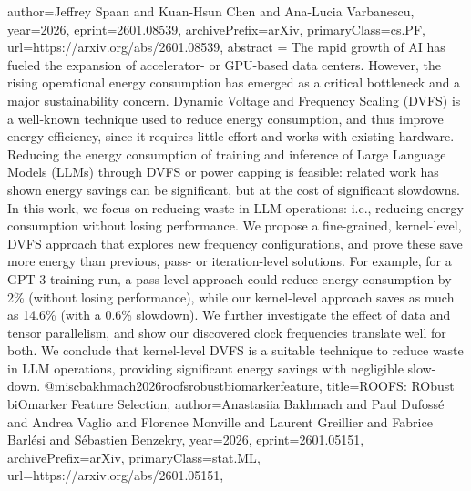 {      author={Jeffrey Spaan and Kuan-Hsun Chen and Ana-Lucia Varbanescu},
      year={2026},
      eprint={2601.08539},
      archivePrefix={arXiv},
      primaryClass={cs.PF},
      url={https://arxiv.org/abs/2601.08539},
      abstract = {The rapid growth of AI has fueled the expansion of accelerator- or GPU-based data centers. However, the rising operational energy consumption has emerged as a critical bottleneck and a major sustainability concern. Dynamic Voltage and Frequency Scaling (DVFS) is a well-known technique used to reduce energy consumption, and thus improve energy-efficiency, since it requires little effort and works with existing hardware. Reducing the energy consumption of training and inference of Large Language Models (LLMs) through DVFS or power capping is feasible: related work has shown energy savings can be significant, but at the cost of significant slowdowns. In this work, we focus on reducing waste in LLM operations: i.e., reducing energy consumption without losing performance. We propose a fine-grained, kernel-level, DVFS approach that explores new frequency configurations, and prove these save more energy than previous, pass- or iteration-level solutions. For example, for a GPT-3 training run, a pass-level approach could reduce energy consumption by 2\% (without losing performance), while our kernel-level approach saves as much as 14.6\% (with a 0.6\% slowdown). We further investigate the effect of data and tensor parallelism, and show our discovered clock frequencies translate well for both. We conclude that kernel-level DVFS is a suitable technique to reduce waste in LLM operations, providing significant energy savings with negligible slow-down.}
}@misc{bakhmach2026roofsrobustbiomarkerfeature,
      title={ROOFS: RObust biOmarker Feature Selection}, 
      author={Anastasiia Bakhmach and Paul Dufossé and Andrea Vaglio and Florence Monville and Laurent Greillier and Fabrice Barlési and Sébastien Benzekry},
      year={2026},
      eprint={2601.05151},
      archivePrefix={arXiv},
      primaryClass={stat.ML},
      url={https://arxiv.org/abs/2601.05151},
}
